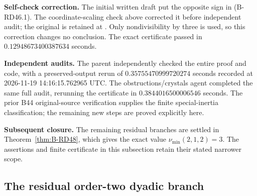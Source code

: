 \par\smallskip\noindent\textbf{Self-check correction.}
The initial written draft put the opposite sign in (B-RD46.1).
The coordinate-scaling check above corrected it before independent
audit; the original is retained at
.
Only nondivisibility by three is used, so this correction changes
no conclusion. The exact certificate passed in
$0.12948673400387634$ seconds.

\par\smallskip\noindent\textbf{Independent audits.}
The parent independently checked the entire proof and code, with a
preserved-output rerun of $0.35755470999720274$ seconds recorded
at 2026-11-19 14:16:15.762965 UTC. The obstructions/crystals agent
completed the same full audit, rerunning the certificate in
$0.3844016500006546$ seconds. The prior B44 original-source
verification supplies the finite special-inertia classification;
the remaining new steps are proved explicitly here.

\par\smallskip\noindent\textbf{Subsequent closure.}
The remaining residual branches are settled in
Theorem~\ref{thm:B-RD48}, which gives the exact value
$\nu_{\min}(2,1,2)=3$. The assertions and finite certificate
in this subsection retain their stated narrower scope.


\subsection{The residual order-two dyadic branch}

